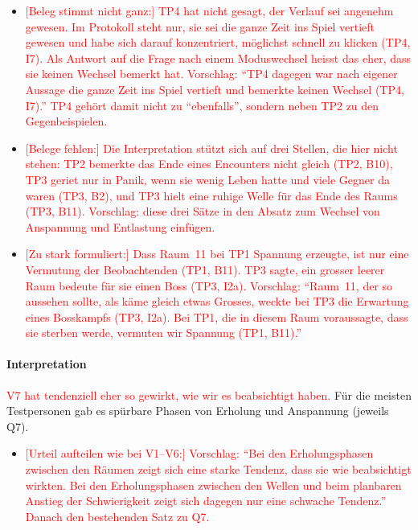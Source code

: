 \documentclass[../Main.tex]{subfiles}
\begin{document}
\begin{itemize}[leftmargin=1.5cm]
    \item \textcolor{red}{[Beleg stimmt nicht ganz:] TP4 hat nicht gesagt, der Verlauf sei angenehm gewesen. Im Protokoll steht nur, sie sei die ganze Zeit ins Spiel vertieft gewesen und habe sich darauf konzentriert, möglichst schnell zu klicken (TP4, I7). Als Antwort auf die Frage nach einem Moduswechsel heisst das eher, dass sie keinen Wechsel bemerkt hat. Vorschlag: \enquote{TP4 dagegen war nach eigener Aussage die ganze Zeit ins Spiel vertieft und bemerkte keinen Wechsel (TP4, I7).} TP4 gehört damit nicht zu \enquote{ebenfalls}, sondern neben TP2 zu den Gegenbeispielen.}
    \item \textcolor{red}{[Belege fehlen:] Die Interpretation stützt sich auf drei Stellen, die hier nicht stehen: TP2 bemerkte das Ende eines Encounters nicht gleich (TP2, B10), TP3 geriet nur in Panik, wenn sie wenig Leben hatte und viele Gegner da waren (TP3, B2), und TP3 hielt eine ruhige Welle für das Ende des Raums (TP3, B11). Vorschlag: diese drei Sätze in den Absatz zum Wechsel von Anspannung und Entlastung einfügen.}
    \item \textcolor{red}{[Zu stark formuliert:] Dass Raum~11 bei TP1 Spannung erzeugte, ist nur eine Vermutung der Beobachtenden (TP1, B11). TP3 sagte, ein grosser leerer Raum bedeute für sie einen Boss (TP3, I2a). Vorschlag: \enquote{Raum~11, der so aussehen sollte, als käme gleich etwas Grosses, weckte bei TP3 die Erwartung eines Bosskampfs (TP3, I2a). Bei TP1, die in diesem Raum voraussagte, dass sie sterben werde, vermuten wir Spannung (TP1, B11).}}
\end{itemize}

\paragraph{Interpretation}
\textcolor{red}{V7 hat tendenziell eher so gewirkt, wie wir es beabsichtigt haben.} Für die meisten Testpersonen gab es spürbare Phasen von Erholung und Anspannung (jeweils Q7).

\begin{itemize}[leftmargin=1.5cm]
    \item \textcolor{red}{[Urteil aufteilen wie bei V1--V6:] Vorschlag: \enquote{Bei den Erholungsphasen zwischen den Räumen zeigt sich eine starke Tendenz, dass sie wie beabsichtigt wirkten. Bei den Erholungsphasen zwischen den Wellen und beim planbaren Anstieg der Schwierigkeit zeigt sich dagegen nur eine schwache Tendenz.} Danach den bestehenden Satz zu Q7.}
\end{itemize}
\end{document}
